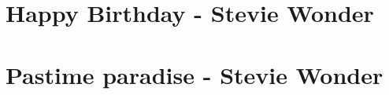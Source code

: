 \documentclass{guitartabs}
\begin{document}
\section{Happy Birthday - Stevie Wonder}
\begin{guitar}

\end{guitar}



\section{Pastime paradise - Stevie Wonder}
\begin{guitar}

\end{guitar}
\end{document}
